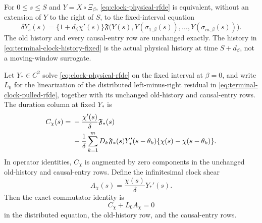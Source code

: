 \begin{lemma}
For \(0\le s\le S\) and \(Y=X\circ\Xi_\beta\),
\cref{eq:clock-physical-rfde} is equivalent, without an extension of
\(Y\) to the right of \(S\), to the fixed-interval equation
\begin{equation}
 \delta Y_s(s)=\{1+d_\beta\chi'(s)\}
 \mathfrak F\bigl(Y(s),Y(\sigma_{1,\beta}(s)),\ldots,
                         Y(\sigma_{m,\beta}(s))\bigr).
                                                        \label{eq:terminal-clock-pulled-rfde}
\end{equation}
The old history and every causal-entry row are unchanged exactly.  The
history in \cref{eq:terminal-clock-history-fixed} is the actual physical
history at time \(S+d_\beta\), not a moving-window surrogate.

Let \(Y_*\in C^2\) solve \cref{eq:clock-physical-rfde} on the fixed
interval at \(\beta=0\), and write \(L_0\) for the linearization of the
distributed left-minus-right residual in
\cref{eq:terminal-clock-pulled-rfde}, together with its unchanged
old-history and causal-entry rows.  The
duration column at fixed \(Y_*\) is
\begin{align}
 C_\chi(s)={}&-\frac{\chi'(s)}{\delta}\mathfrak F_*(s)\notag\\
 &-\frac1\delta\sum_{k=1}^m
 D_k\mathfrak F_*(s)Y_*'(s-\theta_k)
       \{\chi(s)-\chi(s-\theta_k)\}.            \label{eq:terminal-clock-duration-column}
\end{align}
In operator identities, \(C_\chi\) is augmented by zero components in the
unchanged old-history and causal-entry rows.
Define the infinitesimal clock shear
\begin{equation}
 A_\chi(s)=\frac{\chi(s)}{\delta}Y_*'(s).        \label{eq:terminal-clock-domain-shear}
\end{equation}
Then the exact commutator identity is
\begin{equation}
 C_\chi+L_0A_\chi=0                             \label{eq:terminal-clock-commutator}
\end{equation}
in the distributed equation, the old-history row, and the causal-entry
rows.


\end{lemma}
